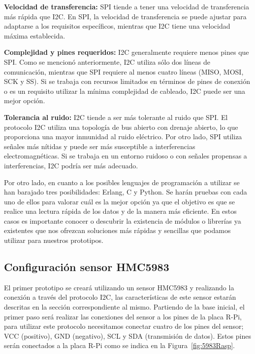 \textbf{Velocidad de transferencia:} SPI tiende a tener una velocidad de transferencia más rápida que I2C. En SPI, la velocidad de transferencia se puede ajustar para adaptarse a los requisitos específicos, mientras que I2C tiene una velocidad máxima establecida.

\textbf{Complejidad y pines requeridos:} I2C generalmente requiere menos pines que SPI. Como se mencionó anteriormente, I2C utiliza sólo dos líneas de comunicación, mientras que SPI requiere al menos cuatro líneas (MISO, MOSI, SCK y SS). Si se trabaja con recursos limitados en términos de pines de conexión o es un requisito utilizar la mínima complejidad de cableado, I2C puede ser una mejor opción.

\textbf{Tolerancia al ruido:} I2C tiende a ser más tolerante al ruido que SPI. El protocolo I2C utiliza una topología de bus abierto con drenaje abierto, lo que proporciona una mayor inmunidad al ruido eléctrico. Por otro lado, SPI utiliza señales más nítidas y puede ser más susceptible a interferencias electromagnéticas. Si se trabaja en un entorno ruidoso o con señales propensas a interferencias, I2C podría ser más adecuado.

Por otro lado, en cuanto a los posibles lenguajes de programación a utilizar se han barajado tres posibilidades: Erlang, C y Python. Se harán pruebas con cada uno de ellos para valorar cuál es la mejor opción ya que el objetivo es que se realice una lectura rápida de los datos y de la manera más eficiente.
En estos casos es importante conocer o descubrir la existencia de módulos o librerías ya existentes que nos ofrezcan soluciones más rápidas y sencillas que podamos utilizar para nuestros prototipos.

\subsection{Configuración sensor HMC5983}

El primer prototipo se creará utilizando un sensor HMC5983 y realizando la conexión a través del protocolo I2C, las características de este sensor estarán descritas en la sección correspondiente al mismo. 
Partiendo de la base inicial, el primer paso será realizar las conexiones del sensor a los pines de la placa R-Pi, para utilizar este protocolo necesitamos conectar cuatro de los pines del sensor; VCC (positivo), GND (negativo), SCL y SDA (transmisión de datos). Estos pines serán conectados a la placa R-Pi como se indica en la Figura~\ref{fig:5983Rasp}.

